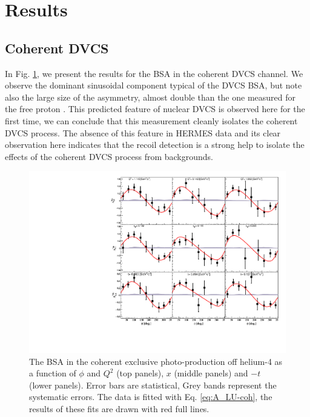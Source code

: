 \documentclass[aps,prc,preprint,superscriptaddress]{revtex4}
\begin{document}
\section{Results}

\subsection{Coherent DVCS}

In Fig. \ref{fig:CohALUphi}, we present the results for the BSA in the coherent DVCS channel. We 
observe the dominant sinusoidal component typical of the DVCS BSA, but note also the large size 
of the asymmetry, almost double than the one measured for the free proton \cite{Jo:2015ema}. This 
predicted feature of nuclear DVCS \cite{Guzey:2003jh} is observed here for the first time, we
can conclude that this measurement cleanly isolates the coherent DVCS process. The absence of 
this feature in HERMES data and its clear observation here indicates that the recoil 
detection is a strong help to isolate the effects of the coherent DVCS process from backgrounds. 

\begin{figure}[bp!]
\center
\includegraphics[width=12cm]{fig3/Coherent_ALU_phi.pdf}
	\caption{The BSA in the coherent exclusive photo-production off helium-4 as a 
	function of $\phi$ and $Q^2$ 
	(top panels), $x$ (middle panels) and $-t$ (lower panels). Error bars are  
	statistical, Grey bands represent the systematic errors. The data is fitted with Eq. 
	\ref{eq:A_LU-coh}, the results of these fits are drawn with red full lines.}
\label{fig:CohALUphi}
\end{figure}
\end{document}
